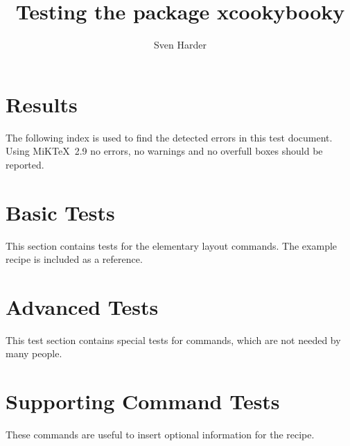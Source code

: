 \documentclass[%
a4paper,
11pt
]{article}
\title{Testing the package xcookybooky}
\author{Sven Harder}
\begin{document}




\section{Results}
The following index is used to find the detected errors in this test document. Using MiKTeX~2.9 no errors, no warnings and no overfull boxes should be reported.
\printindex



\section{Basic Tests}
This section contains tests for the elementary layout commands. The example recipe is included as a reference.




















\section{Advanced Tests}
This test section contains special tests for commands, which are not needed by many people.







\section{Supporting Command Tests}
These commands are useful to insert optional information for the recipe.


\end{document}
